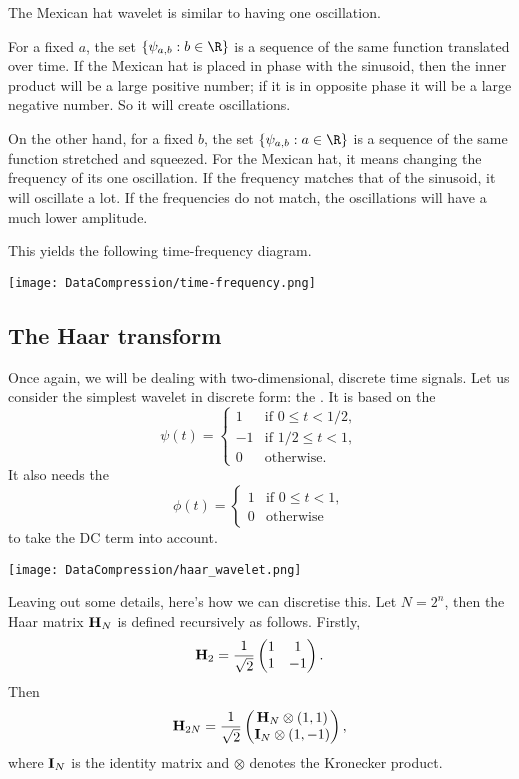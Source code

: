 \documentclass[a4paper, 11pt, openany]{book}
\begin{document}
The Mexican hat wavelet is similar to having one oscillation.


For a fixed $a$, the set $\{ \psi_{a,b} : b \in \R \}$ is a sequence of the same function translated over time. If the Mexican hat is placed in phase with the sinusoid, then the inner product will be a large positive number; if it is in opposite phase it will be a large negative number. So it will create oscillations.

On the other hand, for a fixed $b$, the set $\{ \psi_{a,b} : a \in \R \}$ is a sequence of the same function stretched and squeezed. For the Mexican hat, it means changing the frequency of its one oscillation. If the frequency matches that of the sinusoid, it will oscillate a lot. If the frequencies do not match, the oscillations will have a much lower amplitude.

This yields the following time-frequency diagram.

\begin{center}
\texttt{[image: DataCompression/time-frequency.png]}
\end{center}

\subsection{The Haar transform}

Once again, we will be dealing with two-dimensional, discrete time signals. Let us consider the simplest wavelet in discrete form: the . It is based on the 
\[
    \psi(t) = \begin{cases}
    1 & \text{if } 0 \le t < 1/2,\\
    -1 & \text{if } 1/2 \le t < 1,\\
    0 & \text{otherwise.}
    \end{cases}
\]
It also needs the 
\[
    \phi(t) = \begin{cases}
    1 & \text{if } 0 \le t < 1,\\
    0 & \text{otherwise}
    \end{cases}
\]
to take the DC term into account.

\begin{center}
\texttt{[image: DataCompression/haar\_wavelet.png]}
\end{center}


Leaving out some details, here's how we can discretise this. Let $N = 2^n$, then the Haar matrix ${\bf H}_N$ is defined recursively as follows. Firstly,
\[
    {\bf H}_2 = \frac{1}{\sqrt{2}} \begin{pmatrix}
    1 & 1\\
    1 & -1
    \end{pmatrix}.
\]
Then
\[
    {\bf H}_{2N} = \frac{1}{\sqrt{2}} \begin{pmatrix}
    {\bf H}_N  \otimes (1,1)\\
    {\bf I}_N \otimes (1,-1)
    \end{pmatrix},
\]
where ${\bf I}_N$ is the identity matrix and $\otimes$ denotes the Kronecker product.
\end{document}
